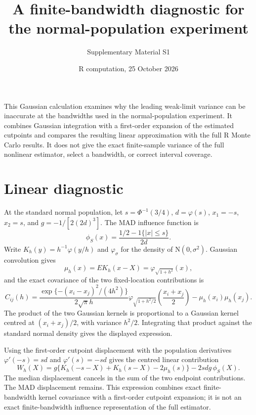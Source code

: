 \documentclass[11pt]{article}
\title{A finite-bandwidth diagnostic for the normal-population experiment}
\author{Supplementary Material S1}
\date{R computation, 25 October 2026}
\begin{document}
\maketitle

This Gaussian calculation examines why the leading weak-limit variance can
be inaccurate at the bandwidths used in the normal-population experiment.
It combines Gaussian integration with a first-order expansion of the
estimated cutpoints and compares the resulting linear approximation with
the full R Monte Carlo results. It does not give the exact finite-sample
variance of the full nonlinear estimator, select a bandwidth, or correct
interval coverage.

\section*{Linear diagnostic}
At the standard normal population, let $s=\Phi^{-1}(3/4)$,
$d=\varphi(s)$, $x_1=-s$, $x_2=s$, and $g=-1/[2(2d)^3]$. The MAD
influence function is
\[
 \phi_S(x)=\frac{1/2-1\{|x|\le s\}}{2d}.
\]
Write $K_h(y)=h^{-1}\varphi(y/h)$ and $\varphi_\sigma$ for the density
of $\mathrm N(0,\sigma^2)$. Gaussian convolution gives
\[
 \mu_h(x)=E K_h(x-X)=\varphi_{\sqrt{1+h^2}}(x),
\]
and the exact covariance of the two fixed-location contributions is
\[
 C_{ij}(h)=\frac{\exp\{-(x_i-x_j)^2/(4h^2)\}}{2\sqrt\pi h}
 \varphi_{\sqrt{1+h^2/2}}\!\left(\frac{x_i+x_j}{2}\right)
 -\mu_h(x_i)\mu_h(x_j).
\]
The product of the two Gaussian kernels is proportional to a Gaussian
kernel centred at $(x_i+x_j)/2$, with variance $h^2/2$. Integrating that
product against the standard normal density gives the displayed expression.

Using the first-order cutpoint displacement with the population derivatives
$\varphi'(-s)=sd$ and $\varphi'(s)=-sd$ gives the centred linear
contribution
\[
 W_h(X)=g\{K_h(-s-X)+K_h(s-X)-2\mu_h(s)\}
        -2sdg\,\phi_S(X).
\]
The median displacement cancels in the sum of the two endpoint
contributions. The MAD displacement remains. This expression combines
exact finite-bandwidth kernel covariance with a first-order cutpoint
expansion; it is not an exact finite-bandwidth influence representation
of the full estimator.
\end{document}
